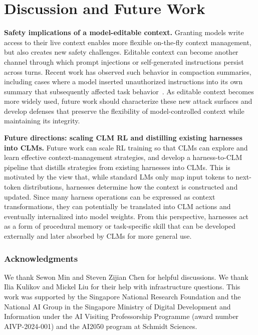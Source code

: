 \documentclass{fairmeta}
\newcommand{\ours}{CLM\xspace}
\newcommand{\oursplural}{CLMs\xspace}
\begin{document}
\section{Discussion and Future Work}

\textbf{Safety implications of a model-editable context.}
Granting models write access to their live context enables more flexible on-the-fly context management, but also creates new safety challenges. Editable context can become another channel through which prompt injections or self-generated instructions persist across turns. Recent work has observed such behavior in compaction summaries, including cases where a model inserted unauthorized instructions into its own summary that subsequently affected task behavior~\citep{openai2026selfgeneratedpromptinjections}. As editable context becomes more widely used, future work should characterize these new attack surfaces and develop defenses that preserve the flexibility of model-controlled context while maintaining its integrity.


\textbf{Future directions: scaling \ours{} RL and distilling existing harnesses into \oursplural.}
Future work can scale RL training so that \oursplural{} can explore and learn effective context-management strategies, and develop a harness-to-\ours{} pipeline that distills strategies from existing harnesses into \oursplural{}. This is motivated by the view that, while standard LMs only map input tokens to next-token distributions, harnesses determine how the context is constructed and updated. Since many harness operations can be expressed as context transformations, they can potentially be translated into \ours{} actions and eventually internalized into model weights. From this perspective, harnesses act as a form of procedural memory or task-specific skill that can be developed externally and later absorbed by \oursplural{} for more general use.

\subsubsection*{Acknowledgments}
We thank Sewon Min and Steven Zijian Chen for helpful discussions. We thank Ilia Kulikov and Mickel Liu for their help with infrastructure questions.
This work was supported by the Singapore National Research Foundation and the National AI Group in the Singapore Ministry of Digital Development and Information under the AI Visiting Professorship Programme (award number AIVP-2024-001) and the AI2050 program at Schmidt Sciences.




\clearpage
\beginappendix

\end{document}
